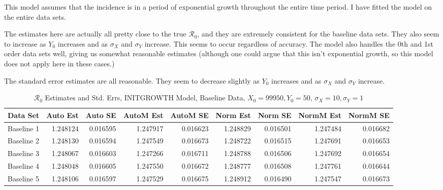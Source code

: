 \documentclass[12pt]{article}
\newcommand{\rr}{\ensuremath{\mathcal{R}_0}}
\begin{document}
This model assumes that the incidence is in a period of exponential growth throughout the entire time period. I have fitted the model on the entire data sets.

The estimates here are actually all pretty close to the true $\rr$, and they are extremely consistent for the baseline data sets. They also seem to increase as $Y_0$ increases and as $\sigma_X$ and $\sigma_Y$ increase. This seems to occur regardless of accuracy. The model also handles the 0th and 1st order data sets well, giving us somewhat reasonable estimates (although one could argue that this isn't exponential growth, so this model does not apply here in these cases.)

The standard error estimates are all reasonable. They seem to decrease slightly as $Y_0$ increases and as $\sigma_X$ and $\sigma_Y$ increase.

\begin{table}[H]
	
	\caption{$\rr$ Estimates and Std. Errs, INITGROWTH Model, 
		Baseline Data, $X_0 = 99950, Y_0 = 50$, 
		$\sigma_X = 10, \sigma_Y = 1$}
	\begin{footnotesize}
		\hskip -1cm
		\begin{tabular}{l|r|r|r|r|r|r|r|r}
			\hline
			Data Set & Auto Est & Auto SE & AutoM Est & AutoM SE & Norm Est & Norm SE & NormM Est & NormM SE\\
			\hline
			Baseline 1 & 1.248124 & 0.016595 & 1.247917 & 0.016623 & 1.248829 & 0.016501 & 1.247484 & 0.016682\\
			\hline
			Baseline 2 & 1.248130 & 0.016594 & 1.247549 & 0.016673 & 1.248722 & 0.016515 & 1.247691 & 0.016653\\
			\hline
			Baseline 3 & 1.248067 & 0.016603 & 1.247266 & 0.016711 & 1.248788 & 0.016506 & 1.247692 & 0.016654\\
			\hline
			Baseline 4 & 1.248048 & 0.016605 & 1.247550 & 0.016672 & 1.248777 & 0.016508 & 1.247761 & 0.016644\\
			\hline
			Baseline 5 & 1.248106 & 0.016597 & 1.247529 & 0.016675 & 1.248912 & 0.016490 & 1.247547 & 0.016673\\
			\hline
		\end{tabular}
	\end{footnotesize}
\end{table}
\end{document}
